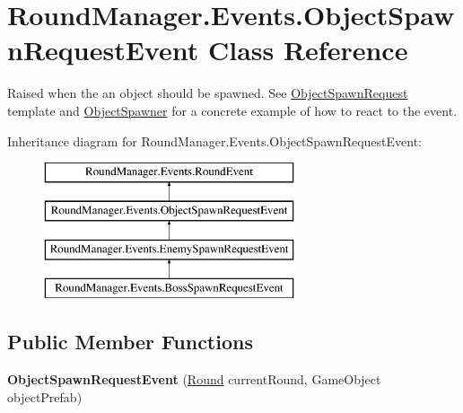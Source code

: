 \hypertarget{class_round_manager_1_1_events_1_1_object_spawn_request_event}{}\section{Round\+Manager.\+Events.\+Object\+Spawn\+Request\+Event Class Reference}
\label{class_round_manager_1_1_events_1_1_object_spawn_request_event}


Raised when the an object should be spawned. See \hyperlink{class_round_manager_1_1_object_spawn_request}{Object\+Spawn\+Request} template and \hyperlink{class_round_manager_1_1_object_spawner}{Object\+Spawner} for a concrete example of how to react to the event.  


Inheritance diagram for Round\+Manager.\+Events.\+Object\+Spawn\+Request\+Event\+:\begin{figure}[H]
\begin{center}
\leavevmode
\includegraphics[height=4.000000cm]{class_round_manager_1_1_events_1_1_object_spawn_request_event}
\end{center}
\end{figure}
\subsection*{Public Member Functions}
\begin{DoxyCompactItemize}
\item 
\hypertarget{class_round_manager_1_1_events_1_1_object_spawn_request_event_a848eff2303041ab603ae37932cd942b2}{}{\bfseries Object\+Spawn\+Request\+Event} (\hyperlink{class_round_manager_1_1_round}{Round} current\+Round, Game\+Object object\+Prefab)\label{class_round_manager_1_1_events_1_1_object_spawn_request_event_a848eff2303041ab603ae37932cd942b2}

\end{DoxyCompactItemize}
